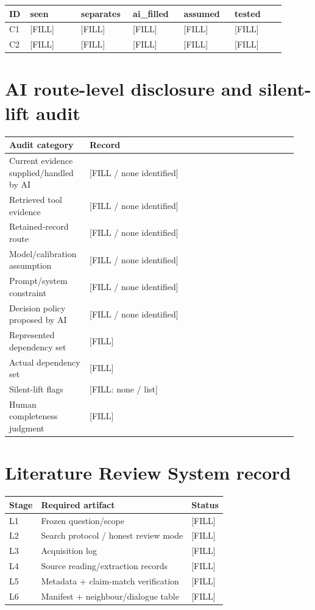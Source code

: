 \documentclass[11pt]{article}
\begin{document}
\begin{longtable}{@{}p{0.05\linewidth}p{0.17\linewidth}p{0.17\linewidth}p{0.17\linewidth}p{0.17\linewidth}p{0.17\linewidth}@{}}
\toprule
ID & seen & separates & ai\_filled & assumed & tested\\
\midrule
\endhead
C1 & [FILL] & [FILL] & [FILL] & [FILL] & [FILL]\\
C2 & [FILL] & [FILL] & [FILL] & [FILL] & [FILL]\\
\bottomrule
\end{longtable}

\section{AI route-level disclosure and silent-lift audit}
\label{app:ai-route}

\begin{longtable}{@{}p{0.26\linewidth}p{0.68\linewidth}@{}}
\toprule
Audit category & Record\\
\midrule
\endhead
Current evidence supplied/handled by AI & [FILL / none identified]\\
Retrieved tool evidence & [FILL / none identified]\\
Retained-record route & [FILL / none identified]\\
Model/calibration assumption & [FILL / none identified]\\
Prompt/system constraint & [FILL / none identified]\\
Decision policy proposed by AI & [FILL / none identified]\\
Represented dependency set & [FILL]\\
Actual dependency set & [FILL]\\
Silent-lift flags & [FILL: none / list]\\
Human completeness judgment & [FILL]\\
\bottomrule
\end{longtable}

\section{Literature Review System record}
\label{app:lrs}

\begin{tabularx}{\linewidth}{@{}lXl@{}}
\toprule
Stage & Required artifact & Status\\
\midrule
L1 & Frozen question/scope & [FILL]\\
L2 & Search protocol / honest review mode & [FILL]\\
L3 & Acquisition log & [FILL]\\
L4 & Source reading/extraction records & [FILL]\\
L5 & Metadata + claim-match verification & [FILL]\\
L6 & Manifest + neighbour/dialogue table & [FILL]\\
\bottomrule
\end{tabularx}
\end{document}
